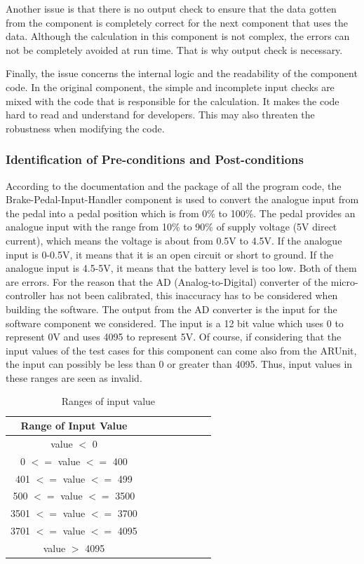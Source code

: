 Another issue is that there is no output check to ensure that the data gotten from the component is completely correct for the next component that uses the data. Although the calculation in this component is not complex, the errors can not be completely avoided at run time. That is why output check is necessary.

Finally, the issue concerns the internal logic and the readability of the component code. In the original component, the simple and incomplete input checks are mixed with the code that is responsible for the calculation. It makes the code hard to read and understand for developers. This may also threaten the robustness when modifying the code. 

\subsubsection{Identification of Pre-conditions and Post-conditions}

According to the documentation %
and the package of all the program code, the Brake-Pedal-Input-Handler component is used to convert the analogue input from the pedal into a pedal position which is from 0\% to 100\%. The pedal provides an analogue input with the range from 10\% to 90\% of supply voltage (5V direct current), which means the voltage is about from 0.5V to 4.5V. If the analogue input is 0-0.5V, it means that it is an open circuit or short to ground. If the analogue input is 4.5-5V, it means that the battery level is too low. %
Both of them are errors. For the reason that the AD (Analog-to-Digital) converter of the micro-controller has not been calibrated, this inaccuracy has to be considered when building the software. %
The output from the AD converter is the input for the software component we considered. The input is a 12 bit value which uses 0 to represent 0V and uses 4095 to represent 5V. Of course, if considering that the input values of the test cases for this component can come also from the ARUnit, the input can possibly be less than 0 or greater than 4095. Thus, input values in these ranges are seen as invalid.

\begin{table}[htb]
\centering
\begin{tabular}{|c|c|c|c|c|c|c|c|}\hline
Range of Input Value\\ \hline
value $<$ 0\\ \hline
0 $<=$ value $<=$ 400\\ \hline
401 $<=$ value $<=$ 499\\ \hline
500 $<=$ value $<=$ 3500\\ \hline
3501 $<=$ value $<=$ 3700\\ \hline
3701 $<=$ value $<=$ 4095\\ \hline
value $>$ 4095\\ \hline
\end{tabular}
\caption{Ranges of input value}
\label{tab:BPIHRanegInput}
\vspace{-.4cm}
\end{table}

